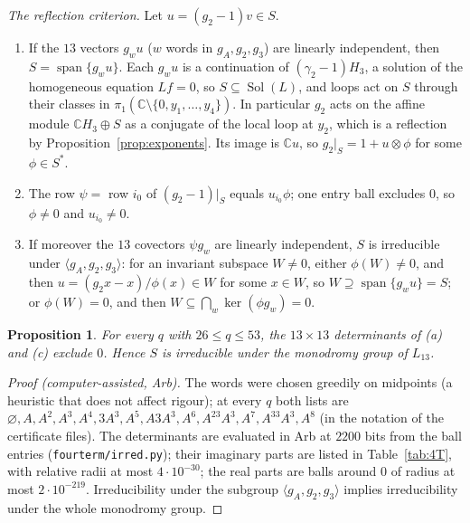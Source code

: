 \documentclass[11pt]{amsart}
\newtheorem{proposition}{Proposition}[section]
\theoremstyle{definition}
\theoremstyle{remark}
\numberwithin{equation}{section}
\newcommand{\CC}{\mathbb{C}}
\newcommand{\Sol}{\operatorname{Sol}}
\newcommand{\file}[1]{{\def\_{\textunderscore\allowbreak}\texttt{#1}}}
\begin{document}
\emph{The reflection criterion.} Let $u=(g_2-1)v\in S$.
\begin{enumerate}
\item[(a)] If the $13$ vectors $g_wu$ ($w$ words in $g_A,g_2,g_3$) are linearly independent, then $S=\operatorname{span}
\{g_wu\}$. Each $g_wu$ is a continuation of $(\gamma_2-1)H_3$, a solution of the homogeneous equation $Lf=0$, so
$S\subseteq\Sol(L)$, and loops act on $S$ through their classes in $\pi_1(\CC\setminus\{0,y_1,\dots,y_4\})$. In
particular $g_2$ acts on the affine module $\CC H_3\oplus S$ as a conjugate of the local loop at $y_2$, which is a
reflection by Proposition~\ref{prop:exponents}. Its image is $\CC u$, so $g_2|_S=1+u\otimes\phi$ for some $\phi\in S^*$.
\item[(b)] The row $\psi=$ row $i_0$ of $(g_2-1)|_S$ equals $u_{i_0}\phi$; one entry ball excludes $0$, so $\phi\ne0$
and $u_{i_0}\ne0$.
\item[(c)] If moreover the $13$ covectors $\psi g_w$ are linearly independent, $S$ is irreducible under
$\langle g_A,g_2,g_3\rangle$: for an invariant subspace $W\ne0$, either $\phi(W)\ne0$, and then
$u=(g_2x-x)/\phi(x)\in W$ for some $x\in W$, so $W\supseteq\operatorname{span}\{g_wu\}=S$; or $\phi(W)=0$, and then
$W\subseteq\bigcap_w\ker(\phi g_w)=0$.
\end{enumerate}

\begin{proposition}\label{prop:irred}
For every $q$ with $26\le q\le53$, the $13\times13$ determinants of (a) and (c) exclude $0$. Hence $S$ is irreducible
under the monodromy group of $L_{13}$.
\end{proposition}

\begin{proof}[Proof (computer-assisted, Arb)]
The words were chosen greedily on midpoints (a heuristic that does not affect rigour); at every $q$ both lists are
$\varnothing,A,A^2,A^3,A^4,3A^3,A^5,A3A^3,A^6,A^23A^3,A^7,A^33A^3,A^8$ (in the notation of the certificate files). The
determinants are evaluated in Arb at $2200$ bits from the ball entries (\file{fourterm/irred.py}); their imaginary parts
are listed in Table~\ref{tab:4T}, with relative radii at most $4\cdot10^{-30}$; the real parts are balls around $0$ of
radius at most $2\cdot10^{-219}$. Irreducibility under the subgroup $\langle g_A,g_2,g_3\rangle$ implies irreducibility under the
whole monodromy group.
\end{proof}
\end{document}
